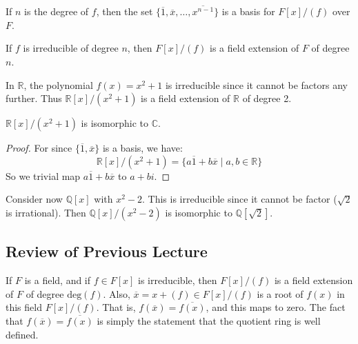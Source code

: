     If $n$ is the degree of $f$, then the set
    $\{\overline{1},\overline{x},\dots,\overline{x^{n-1}}\}$ is a basis
    for $F[x]/(f)$ over $F$.
    \begin{theorem}
        If $f$ is irreducible of degree $n$, then
        $F[x]/(f)$ is a field extension of $F$ of degree $n$.
    \end{theorem}
    \begin{example}
        In $\mathbb{R}$, the polynomial $f(x)=x^{2}+1$ is irreducible
        since it cannot be factors any further. Thus
        $\mathbb{R}[x]/(x^{2}+1)$ is a field extension of $\mathbb{R}$
        of degree 2.
    \end{example}
    \begin{theorem}
        $\mathbb{R}[x]/(x^{2}+1)$ is isomorphic to $\mathbb{C}$.
    \end{theorem}
    \begin{proof}
        For since $\{\overline{1},\overline{x}\}$ is a basis, we have:
        \begin{equation}
            \mathbb{R}[x]/(x^{2}+1)=
                \{a\overline{1}+b\overline{x}\;|\;a,b\in\mathbb{R}\}
        \end{equation}
        So we trivial map $a\overline{1}+b\overline{x}$ to $a+bi$.
    \end{proof}
    \begin{example}
        Consider now $\mathbb{Q}[x]$ with $x^{2}-2$. This is irreducible
        since it cannot be factor ($\sqrt{2}$ is irrational). Then
        $\mathbb{Q}[x]/(x^{2}-2)$ is isomorphic to
        $\mathbb{Q}[\sqrt{2}]$.
    \end{example}
\subsection{Review of Previous Lecture}
    If $F$ is a field, and if $f\in{F}[x]$ is irreducible, then
    $F[x]/(f)$ is a field extension of $F$ of degree $\textrm{deg}(f)$.
    Also, $\overline{x}=x+(f)\in{F}[x]/(f)$ is a root of $f(x)$ in this
    field $F[x]/(f)$. That is, $f(\overline{x})=\overline{f(x)}$, and
    this maps to zero. The fact that $f(\overline{x})=\overline{f(x)}$
    is simply the statement that the quotient ring is well defined.